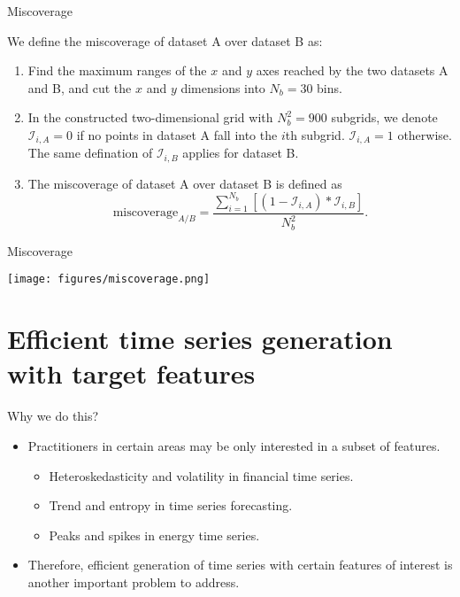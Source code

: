 \documentclass[12pt,ignorenonframetext,compress]{beamer}
\providecommand{\tightlist}{%
  \setlength{\itemsep}{0pt}\setlength{\parskip}{0pt}}
\begin{document}
\begin{frame}{Miscoverage}
\protect\hypertarget{miscoverage}{}

We define the miscoverage of dataset A over dataset B as:

\begin{enumerate}
\tightlist
\item
  Find the maximum ranges of the \(x\) and \(y\) axes reached by the two
  datasets A and B, and cut the \(x\) and \(y\) dimensions into
  \(N_b = 30\) bins.
\item
  In the constructed two-dimensional grid with \(N_b^2 = 900\) subgrids,
  we denote \(\mathcal{I}_{i,A} = 0\) if no points in dataset A fall
  into the \(i\)th subgrid. \(\mathcal{I}_{i,A} = 1\) otherwise. The
  same defination of \(\mathcal{I}_{i,B}\) applies for dataset B.
\item
  The miscoverage of dataset A over dataset B is defined as
  \[\text{miscoverage}_{A/B} = \frac{\sum\limits_{i = 1}^{N_b}[(1 - \mathcal{I}_{i,A})*\mathcal{I}_{i,B}]}{N_b^2}.\]
\end{enumerate}

\end{frame}

\begin{frame}{Miscoverage}
\protect\hypertarget{miscoverage-1}{}

\centerline{\texttt{[image: figures/miscoverage.png]}}

\end{frame}

\hypertarget{new-time-series-generation-based-on-mar-models}{%
\section{Efficient time series generation with target features}\label{new-time-series-generation-based-on-mar-models}}

\begin{frame}{Why we do this?}
\protect\hypertarget{new-time-series-generation}{}

\begin{itemize}
  \item 
  Practitioners in certain areas may be only interested in a subset of features.
  \begin{itemize}
    \item
   Heteroskedasticity and volatility in financial time series.
   \item
    Trend and entropy in time series forecasting.
    \item 
    Peaks and spikes in energy time series.
  \end{itemize}
\item
  Therefore, efficient generation of time series with certain features of interest is another important problem to address.
\end{itemize}
\end{frame}
\end{document}
